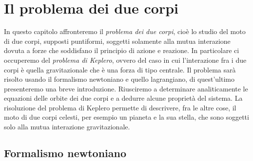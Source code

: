 \chapter{Il problema dei due corpi}
\label{chap:due-corpi}

In questo capitolo affronteremo il \emph{problema dei due corpi}, cioè lo studio
del moto di due corpi, supposti puntiformi, soggetti solamente alla mutua
interazione dovuta a forze che soddisfano il principio di azione e reazione. In
particolare ci occuperemo del \emph{problema di Keplero}, ovvero del caso in cui
l'interazione fra i due corpi è quella gravitazionale che è una forza di tipo
centrale. Il problema sarà risolto usando il formalismo newtoniano e quello
lagrangiano, di quest'ultimo presenteremo una breve introduzione. Riusciremo a
determinare analiticamente le equazioni delle orbite dei due corpi e a dedurre
alcune proprietà del sistema. La risoluzione del problema di Keplero permette di
descrivere, fra le altre cose, il moto di due corpi celesti, per esempio un
pianeta e la sua stella, che sono soggetti solo alla mutua interazione
gravitazionale.

\section{Formalismo newtoniano}
\label{sec:formalismo-newton}

